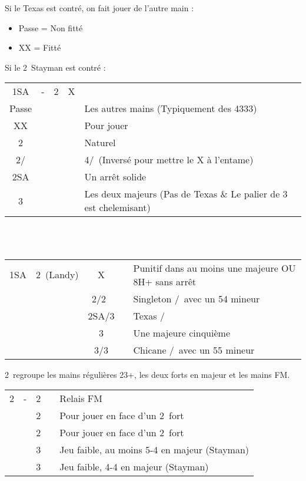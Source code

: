 \documentclass[a4paper, oneside, 11pt]{report}
\begin{document}
		Si le Texas est contré, on fait jouer de l'autre main :
		\begin{itemize}
		\item Passe = Non fitté
		\item XX = Fitté\\
		\end{itemize}
		
		Si le 2\trefle\ Stayman est contré :\\
		\begin{tabular}{cccc|l}
		1SA & - & 2\trefle & X &\\
		Passe &&&& Les autres mains (Typiquement des 4333)\\
		XX &&&& Pour jouer\\
		2\carreau &&&& Naturel\\
		2\coeur/\pique &&&& 4\pique/\coeur\ (Inversé pour mettre le X à l'entame)\\
		2SA &&&& Un arrêt solide\\
		3\trefle &&&& Les deux majeurs (Pas de Texas \& Le palier de 3 est chelemisant)\\
		\end{tabular}\\\\
		
		\begin{tabular}{cccc|l}
		1SA & 2\trefle\ (Landy) & X && Punitif dans au moins une majeure OU 8H+ sans arrêt\\
		&& 2\coeur/2\pique\ && Singleton \pique/\coeur\ avec un 54 mineur\\
		&& 2SA/3\trefle && Texas \trefle/\carreau\\
		&& 3\carreau && Une majeure cinquième\\
		&& 3\coeur/3\pique && Chicane \pique/\coeur\ avec un 55 mineur\\
		\end{tabular}

	2\trefle\ regroupe les mains régulières 23+, les deux forts en majeur et les mains FM.\\
	
	\begin{tabular}{cccc|l}
	2\trefle & - & 2\carreau && Relais FM\\
	&& 2\coeur && Pour jouer en face d'un 2\coeur\ fort\\
	&& 2\pique && Pour jouer en face d'un 2\pique\ fort\\
	&& 3\trefle && Jeu faible, au moins 5-4 en majeur (Stayman)\\
	&& 3\carreau && Jeu faible, 4-4 en majeur (Stayman)\\
	\end{tabular}\\\\
	
\end{document}
